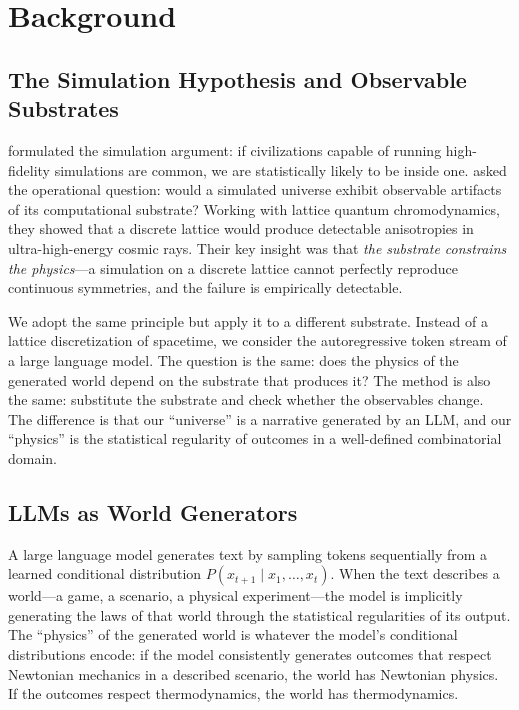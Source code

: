 \documentclass[12pt,a4paper]{article}
\begin{document}
\section{Background}
\label{sec:background}

\subsection{The Simulation Hypothesis and Observable Substrates}
\label{sec:simulation_hypothesis}

\citet{bostrom2003} formulated the simulation argument: if civilizations capable of running high-fidelity simulations are common, we are statistically likely to be inside one. \citet{beane2014} asked the operational question: would a simulated universe exhibit observable artifacts of its computational substrate? Working with lattice quantum chromodynamics, they showed that a discrete lattice would produce detectable anisotropies in ultra-high-energy cosmic rays. Their key insight was that \emph{the substrate constrains the physics}---a simulation on a discrete lattice cannot perfectly reproduce continuous symmetries, and the failure is empirically detectable.

We adopt the same principle but apply it to a different substrate. Instead of a lattice discretization of spacetime, we consider the autoregressive token stream of a large language model. The question is the same: does the physics of the generated world depend on the substrate that produces it? The method is also the same: substitute the substrate and check whether the observables change. The difference is that our ``universe'' is a narrative generated by an LLM, and our ``physics'' is the statistical regularity of outcomes in a well-defined combinatorial domain.

\subsection{LLMs as World Generators}
\label{sec:llm_worlds}

A large language model generates text by sampling tokens sequentially from a learned conditional distribution $P(x_{t+1} \mid x_1, \ldots, x_t)$. When the text describes a world---a game, a scenario, a physical experiment---the model is implicitly generating the laws of that world through the statistical regularities of its output. The ``physics'' of the generated world is whatever the model's conditional distributions encode: if the model consistently generates outcomes that respect Newtonian mechanics in a described scenario, the world has Newtonian physics. If the outcomes respect thermodynamics, the world has thermodynamics.
\end{document}
